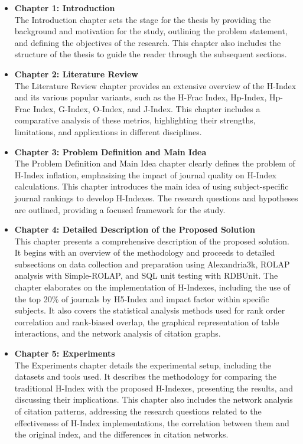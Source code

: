 \begin{itemize}
    \item \textbf{Chapter 1: Introduction} \\
    The Introduction chapter sets the stage for the thesis by providing the background and motivation for the study, outlining the problem statement, and defining the objectives of the research. This chapter also includes the structure of the thesis to guide the reader through the subsequent sections.
    
    \item \textbf{Chapter 2: Literature Review} \\
    The Literature Review chapter provides an extensive overview of the H-Index and its various popular variants, such as the H-Frac Index, Hp-Index, Hp-Frac Index, G-Index, O-Index, and J-Index. This chapter includes a comparative analysis of these metrics, highlighting their strengths, limitations, and applications in different disciplines.
    
    \item \textbf{Chapter 3: Problem Definition and Main Idea} \\
    The Problem Definition and Main Idea chapter clearly defines the problem of H-Index inflation, emphasizing the impact of journal quality on H-Index calculations. This chapter introduces the main idea of using subject-specific journal rankings to develop H-Indexes. The research questions and hypotheses are outlined, providing a focused framework for the study.
    
    \item \textbf{Chapter 4: Detailed Description of the Proposed Solution} \\
    This chapter presents a comprehensive description of the proposed solution. 
    It begins with an overview of the methodology and proceeds to detailed subsections
    on data collection and preparation using Alexandria3k, ROLAP analysis with Simple-ROLAP,
    and SQL unit testing with RDBUnit. The chapter elaborates on the implementation of H-Indexes,
    including the use of the top 20\% of journals by H5-Index and impact factor within specific subjects.
    It also covers the statistical analysis methods used for rank order correlation and rank-biased overlap,
    the graphical representation of table interactions, and the network analysis of citation graphs.
    
    \item \textbf{Chapter 5: Experiments} \\
    The Experiments chapter details the experimental setup,
     including the datasets and tools used. It describes the methodology for comparing the traditional H-Index with the proposed H-Indexes,
     presenting the results, and discussing their implications. This chapter also includes the network analysis of citation patterns,
     addressing the research questions related to the effectiveness of H-Index implementations, the correlation between them and the
     original index, and the differences in citation networks.
    

\end{itemize}
